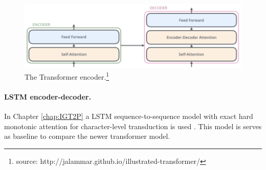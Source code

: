 \begin{figure}[t]
    \centering
    \includegraphics[width=14cm]{figs/Transformer_simplified.png}
    \caption[Transformer]{The Transformer encoder.\footnote{source: http://jalammar.github.io/illustrated-transformer/}}
    \label{fig:transformer}
\end{figure}

\paragraph{LSTM encoder-decoder.} In Chapter \ref{chap:IGT2P} a LSTM sequence-to-sequence model with exact hard monotonic attention for character-level transduction is used \citep{wu-cotterell-2019-exact}. This model is serves as baseline to compare the newer transformer model. 
